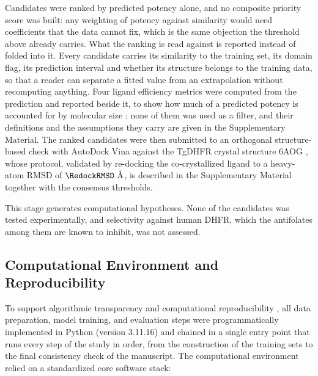 Candidates were ranked by predicted potency alone, and no composite priority score was built: any weighting of potency
against similarity would need coefficients that the data cannot fix, which is the same objection the threshold above
already carries. What the ranking is read against is reported instead of folded into it. Every candidate carries its
similarity to the training set, its domain flag, its prediction interval and whether its structure belongs to the
training data, so that a reader can separate a fitted value from an extrapolation without recomputing anything. Four
ligand efficiency metrics were computed from the prediction and
reported beside it, to show how much of a predicted potency is accounted for by molecular size \citep{hopkins2004,
hopkins2014}; none of them was used as a filter, and their definitions and the assumptions they carry are given in the
Supplementary Material. The ranked candidates were then submitted to an orthogonal structure-based check with AutoDock
Vina against the TgDHFR crystal structure 6AOG \citep{trott2009, consortium2019}, whose protocol, validated by
re-docking the co-crystallized ligand to a heavy-atom RMSD of $\RedockRMSD\text{ \AA}$, is described in the
Supplementary Material together with the consensus thresholds.

This stage generates computational hypotheses. None of the candidates was tested experimentally, and selectivity
against human DHFR, which the antifolates among them are known to inhibit, was not assessed.

\subsection{Computational Environment and Reproducibility}

To support algorithmic transparency and computational reproducibility \citep{rojas2026}, all data preparation, model training, and evaluation steps were programmatically implemented in Python (version 3.11.16) and chained in a single entry point that runs every step of the study in order, from the construction of the training sets to the final consistency check of the manuscript. The computational environment relied on a standardized core software stack:


